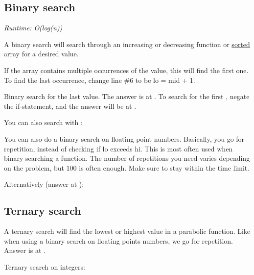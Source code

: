 
\subsection*{Binary search}

\textit{Runtime: O(log(n))}

A binary search will search through an increasing or decreasing function or \underline{sorted} array for a desired value.



If the array contains multiple occurrences of the value, this will find the first one. To find the last occurrence, change line \#6 to be lo = mid + 1.



Binary search for the last  value. The answer is at . To search for the first , negate the if-statement, and the answer will be at . 



You can also search with :



You can also do a binary search on floating point numbers. Basically, you go for repetition, instead of checking if lo exceeds hi. This is most often used when binary searching a function. The number of repetitions you need varies depending on the problem, but 100 is often enough. Make sure to stay within the time limit.



Alternatively (answer at ):



\subsection*{Ternary search}

A ternary search will find the lowest or highest value in a parabolic function. Like when using a binary search on floating points numbers, we go for repetition. Answer is at .



Ternary search on integers:



\newpage
